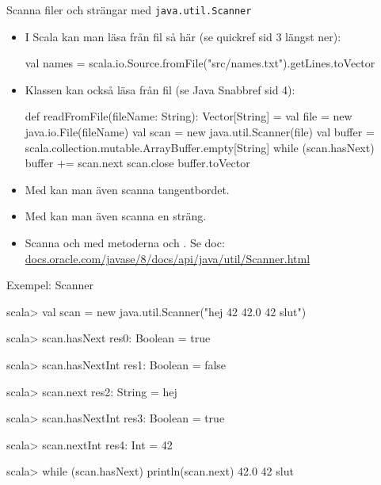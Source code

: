 \begin{Slide}{Scanna filer och strängar med \texttt{java.util.Scanner}}\SlideFontTiny
\setlength{\leftmargini}{0pt}
\begin{itemize}
\item I Scala kan man läsa från fil så här (se quickref sid 3 längst ner):

\begin{Code}
val names = scala.io.Source.fromFile("src/names.txt").getLines.toVector
\end{Code}

\item Klassen  kan också läsa från fil (se Java Snabbref sid 4):


\begin{Code}
def readFromFile(fileName: String): Vector[String] = {
  val file = new java.io.File(fileName)
  val scan = new java.util.Scanner(file)
  val buffer = scala.collection.mutable.ArrayBuffer.empty[String]
  while (scan.hasNext) {
    buffer += scan.next
  }
  scan.close
  buffer.toVector
}
\end{Code}

\item Med  kan man även scanna tangentbordet.

\item Med  kan man även scanna en sträng.

\item Scanna  och  med metoderna  och . Se doc: \href{https://docs.oracle.com/javase/8/docs/api/java/util/Scanner.html}{\SlideFontTiny docs.oracle.com/javase/8/docs/api/java/util/Scanner.html}
\end{itemize}
\end{Slide}


\begin{Slide}{Exempel: Scanner}
\begin{REPL}
scala> val scan = new java.util.Scanner("hej 42 42.0   42 slut")

scala> scan.hasNext
res0: Boolean = true

scala> scan.hasNextInt
res1: Boolean = false

scala> scan.next
res2: String = hej

scala> scan.hasNextInt
res3: Boolean = true

scala> scan.nextInt
res4: Int = 42

scala> while (scan.hasNext) println(scan.next)
42.0
42
slut
\end{REPL}
\end{Slide}



